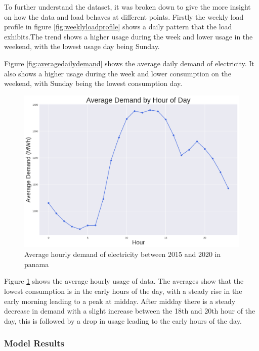  
  To further understand the dataset, it was broken down to give the more insight on how the data and load behaves at different points. Firstly the weekly load profile in figure \ref{fig:weeklyloadprofile} shows a daily pattern that the load exhibits.The trend shows a higher usage during the week and lower usage in the weekend, with the lowest usage day being Sunday. 
  
  
  Figure \ref{fig:averagedailydemand} shows the average daily demand  of electricity. It also shows a higher usage during the week and lower consumption on the weekend, with Sunday being the lowest consumption day. 
  \begin{figure}[h]
  	\centering
  	\includegraphics[width=0.45\linewidth]{Chapters/images/results/average_hourly_demand}
  	\caption{Average hourly demand of electricity between 2015 and 2020 in panama}
  	\label{fig:averagehourlydemand}
  \end{figure}
  
  Figure \ref{fig:averagehourlydemand} shows the average hourly usage of data. The averages show that the lowest consumption is in the early hours of the day, with a steady rise in the early morning leading to a peak at midday. After midday there is a steady decrease in demand with a slight increase between the 18th and 20th hour of the day, this is followed by a drop in usage leading to the early hours of the day.  


\subsubsection{Model Results}